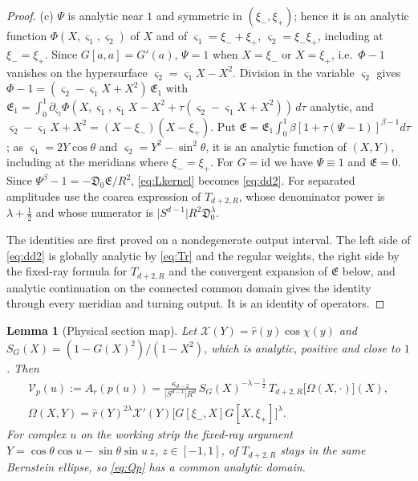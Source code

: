 \documentclass[11pt]{amsart}
\numberwithin{equation}{section}
\newtheorem{lemma}[theorem]{Lemma}
\theoremstyle{definition}
\theoremstyle{remark}
\newcommand{\abs}[1]{\lvert #1\rvert}
\newcommand{\id}{\mathrm{id}}
\newcommand{\Disc}{\mathfrak D}
\newcommand{\cV}{\mathcal V}
\begin{document}
\begin{proof}
(c) $\Psi$ is analytic near $1$ and symmetric in $(\xi_-,\xi_+)$; hence it is an analytic function $\Phi(X,\varsigma_1,\varsigma_2)$ of $X$ and of $\varsigma_1=\xi_-+\xi_+$, $\varsigma_2=\xi_-\xi_+$, including at $\xi_-=\xi_+$. Since $G[a,a]=G'(a)$, $\Psi=1$ when $X=\xi_-$ or $X=\xi_+$, i.e.\ $\Phi-1$ vanishes on the hypersurface $\varsigma_2=\varsigma_1X-X^2$. Division in the variable $\varsigma_2$ gives $\Phi-1=(\varsigma_2-\varsigma_1X+X^2)\,\mathfrak E_1$ with $\mathfrak E_1=\int_0^1\partial_{\varsigma_2}\Phi(X,\varsigma_1,\varsigma_1X-X^2+\tau(\varsigma_2-\varsigma_1X+X^2))\,d\tau$ analytic, and $\varsigma_2-\varsigma_1X+X^2=(X-\xi_-)(X-\xi_+)$. Put $\mathfrak E=\mathfrak E_1\int_0^1\beta[1+\tau(\Psi-1)]^{\beta-1}d\tau$; as $\varsigma_1=2Y\cos\theta$ and $\varsigma_2=Y^2-\sin^2\theta$, it is an analytic function of $(X,Y)$, including at the meridians where $\xi_-=\xi_+$. For $G=\id$ we have $\Psi\equiv1$ and $\mathfrak E=0$. Since $\Psi^\beta-1=-\Disc_0\mathfrak E/R^2$, \eqref{eq:Lkernel} becomes \eqref{eq:dd2}. For separated amplitudes use the coarea expression of $T_{d+2,R}$, whose denominator power is $\lambda+\frac12$ and whose numerator is $\abs{S^{d-1}}R^2\Disc_0^\lambda$.

The identities are first proved on a nondegenerate output interval. The left side of \eqref{eq:dd2} is globally analytic by \eqref{eq:Tr} and the regular weights, the right side by the fixed-ray formula for $T_{d+2,R}$ and the convergent expansion of $\mathfrak E$ below, and analytic continuation on the connected common domain gives the identity through every meridian and turning output. It is an identity of operators.
\end{proof}

\begin{lemma}[Physical section map]\label{lem:physmap}
Let $\mathcal X(Y)=\hat r(y)\cos\chi(y)$ and $S_G(X)=(1-G(X)^2)/(1-X^2)$, which is analytic, positive and close to $1$. Then
\begin{equation}\label{eq:Qp}
\begin{gathered}
\cV_p(u):=A_r(p(u))=\frac{\kappa_{d-2}}{\abs{S^{d-1}}R^d}\,S_G(X)^{-\lambda-\frac12}\,T_{d+2,R}\bigl[\Omega(X,\cdot)\bigr](X),\\
\Omega(X,Y)=\hat r(Y)^{2\lambda}\mathcal X'(Y)\bigl[G[\xi_-,X]G[X,\xi_+]\bigr]^\lambda .
\end{gathered}
\end{equation}
For complex $u$ on the working strip the fixed-ray argument $Y=\cos\theta\cos u-\sin\theta\sin u\,z$, $z\in[-1,1]$, of $T_{d+2,R}$ stays in the same Bernstein ellipse, so \eqref{eq:Qp} has a common analytic domain.
\end{lemma}
\end{document}
